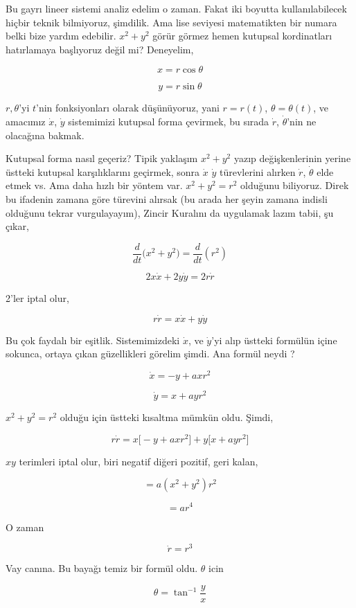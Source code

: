 \documentclass[12pt,fleqn]{article}\usepackage{../../common}
\begin{document}
Bu gayrı lineer sistemi analiz edelim o zaman. Fakat iki boyutta
kullanılabilecek hiçbir teknik bilmiyoruz, şimdilik. Ama lise seviyesi
matematikten bir numara belki bize yardım edebilir. $x^2 + y^2$ görür görmez
hemen kutupsal kordinatları hatırlamaya başlıyoruz değil mi? Deneyelim,

$$ x = r\cos\theta $$

$$ y = r\sin\theta $$

$r,\theta$'yi $t$'nin fonksiyonları olarak düşünüyoruz, yani $r=r(t)$, $\theta =
\theta(t)$, ve amacımız $\dot{x}$, $\dot{y}$ sistemimizi kutupsal forma
çevirmek, bu sırada $\dot{r}$, $\dot{\theta}$'nin ne olacağına bakmak.

Kutupsal forma nasıl geçeriz? Tipik yaklaşım $x^2+y^2$ yazıp değişkenlerinin
yerine üstteki kutupsal karşılıklarını geçirmek, sonra $\dot{x}$ $\dot{y}$
türevlerini alırken $\dot{r}$, $\dot{\theta}$ elde etmek vs. Ama daha hızlı bir
yöntem var. $x^2 + y^2 = r^2$ olduğunu biliyoruz. Direk bu ifadenin zamana göre
türevini alırsak (bu arada her şeyin zamana indisli olduğunu tekrar
vurgulayayım),  Zincir Kuralını da uygulamak lazım tabii, şu çıkar,

$$ \frac{d}{dt} \big( x^2 + y^2 \big) = \frac{d}{dt} (r^2)$$

$$ 2x\dot{x} + 2y\dot{y} = 2r\dot{r} $$

2'ler iptal olur,

$$ r\dot{r} = x\dot{x} + y\dot{y}  $$

Bu çok faydalı bir eşitlik. Sistemimizdeki $\dot{x}$, ve $\dot{y}$'yi alıp
üstteki formülün içine sokunca, ortaya çıkan güzellikleri görelim şimdi. Ana
formül neydi ?

$$ \dot{x} = -y + ax r^2$$

$$ \dot{y} = x + ayr^2 $$

$x^2+y^2 = r^2$ olduğu için üstteki kısaltma mümkün oldu. Şimdi,

$$ r\dot{r} = x \bigg[ -y + axr^2 \bigg] + y \bigg[ x + ayr^2\bigg] $$

$xy$ terimleri iptal olur, biri negatif diğeri pozitif, geri kalan,

$$ = a (x^2+y^2)r^2 $$

$$ = ar^4 $$

O zaman

$$ \dot{r} = r^3 $$

Vay canına. Bu bayağı temiz bir formül oldu. $\theta$ icin

$$ \theta = \tan^{-1} \frac{y}{x} $$
\end{document}
